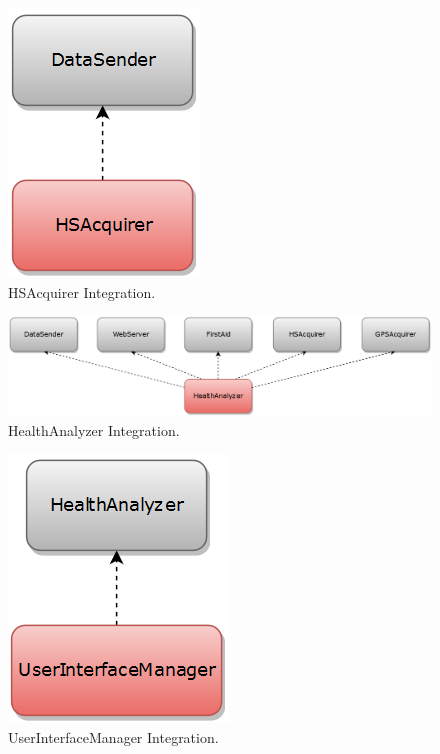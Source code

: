 \begin{figure}[H]
\centering
\includegraphics[scale=0.7]{Images/IntegrationPlanImages/fig10.png}
\caption{HSAcquirer Integration.}
\end{figure}

\begin{figure}[H]
\centering
\includegraphics[scale=0.7]{Images/IntegrationPlanImages/fig11.png}
\caption{HealthAnalyzer Integration.}
\end{figure}

\begin{figure}[H]
\centering
\includegraphics[scale=0.7]{Images/IntegrationPlanImages/fig12.png}
\caption{UserInterfaceManager Integration.}
\end{figure}

